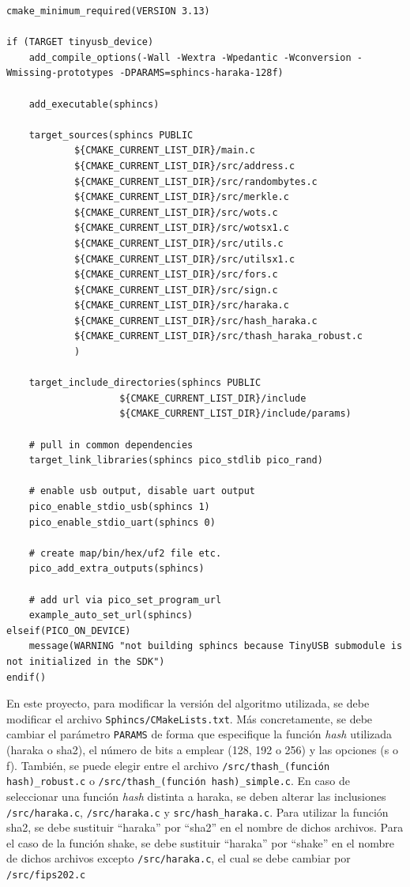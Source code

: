 \begin{lstlisting}[label={lst:sphincs-make},style=Cnice,firstnumber=1,caption={Archivo \texttt{Sphincs/CMakeLists.txt}.}]
cmake_minimum_required(VERSION 3.13)

if (TARGET tinyusb_device)    
    add_compile_options(-Wall -Wextra -Wpedantic -Wconversion -Wmissing-prototypes -DPARAMS=sphincs-haraka-128f)

    add_executable(sphincs)

    target_sources(sphincs PUBLIC
            ${CMAKE_CURRENT_LIST_DIR}/main.c
            ${CMAKE_CURRENT_LIST_DIR}/src/address.c
            ${CMAKE_CURRENT_LIST_DIR}/src/randombytes.c
            ${CMAKE_CURRENT_LIST_DIR}/src/merkle.c
            ${CMAKE_CURRENT_LIST_DIR}/src/wots.c
            ${CMAKE_CURRENT_LIST_DIR}/src/wotsx1.c
            ${CMAKE_CURRENT_LIST_DIR}/src/utils.c
            ${CMAKE_CURRENT_LIST_DIR}/src/utilsx1.c
            ${CMAKE_CURRENT_LIST_DIR}/src/fors.c
            ${CMAKE_CURRENT_LIST_DIR}/src/sign.c
            ${CMAKE_CURRENT_LIST_DIR}/src/haraka.c
            ${CMAKE_CURRENT_LIST_DIR}/src/hash_haraka.c
            ${CMAKE_CURRENT_LIST_DIR}/src/thash_haraka_robust.c
            )
    
    target_include_directories(sphincs PUBLIC
                    ${CMAKE_CURRENT_LIST_DIR}/include
                    ${CMAKE_CURRENT_LIST_DIR}/include/params)

    # pull in common dependencies
    target_link_libraries(sphincs pico_stdlib pico_rand)

    # enable usb output, disable uart output
    pico_enable_stdio_usb(sphincs 1)
    pico_enable_stdio_uart(sphincs 0)

    # create map/bin/hex/uf2 file etc.
    pico_add_extra_outputs(sphincs)

    # add url via pico_set_program_url
    example_auto_set_url(sphincs)
elseif(PICO_ON_DEVICE)
    message(WARNING "not building sphincs because TinyUSB submodule is not initialized in the SDK")
endif()
\end{lstlisting}

En este proyecto, para modificar la versión del algoritmo utilizada, se debe modificar el archivo \texttt{Sphincs/CMakeLists.txt}.
Más concretamente, se debe cambiar el parámetro \texttt{PARAMS} de forma que especifique la función \textit{hash} utilizada (haraka o sha2), el número de bits a emplear (128, 192 o 256) y las opciones (s o f).
También, se puede elegir entre el archivo \texttt{/src/thash\_(función hash)\_robust.c} o \texttt{/src/thash\_(función hash)\_simple.c}.
En caso de seleccionar una función \textit{hash} distinta a haraka, se deben alterar las inclusiones \texttt{/src/haraka.c}, \texttt{/src/haraka.c} y \texttt{src/hash\_haraka.c}.
Para utilizar la función sha2, se debe sustituir ``haraka'' por ``sha2'' en el nombre de dichos archivos.
Para el caso de la función shake, se debe sustituir ``haraka'' por ``shake'' en el nombre de dichos archivos excepto \texttt{/src/haraka.c}, el cual se debe cambiar por \texttt{/src/fips202.c}


